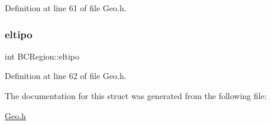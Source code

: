 Definition at line 61 of file Geo.\+h.

\mbox{\label{structBCRegion_a7826a11d6afcbcad4c4b306cd191c6d6}} 
\subsubsection{\texorpdfstring{eltipo}{eltipo}}
{\footnotesize\ttfamily int B\+C\+Region\+::eltipo}



Definition at line 62 of file Geo.\+h.



The documentation for this struct was generated from the following file\+:\begin{DoxyCompactItemize}
\item 
\hyperlink{Geo_8h}{Geo.\+h}\end{DoxyCompactItemize}
